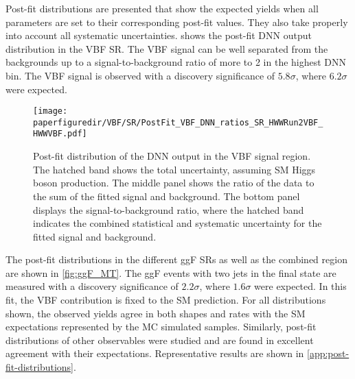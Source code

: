 Post-fit distributions are presented that show the expected yields when all parameters are set to their corresponding post-fit values. They also take properly into account all systematic uncertainties.  shows the post-fit DNN output distribution in the VBF SR.
The VBF signal can be well separated from the backgrounds up to a signal-to-background ratio of more to 2 in the highest DNN bin. 
The VBF signal is observed with a discovery significance of $5.8\sigma$, where $6.2\sigma$ were expected.
\begin{figure}[htb]
  \centering
  \texttt{[image: \\paperfiguredir/VBF/SR/PostFit\_VBF\_DNN\_ratios\_SR\_HWWRun2VBF\_HWWVBF.pdf]}
  \caption{
    Post-fit distribution of the DNN output in the VBF signal region.
    The hatched band shows the total uncertainty, assuming SM Higgs boson production.
    The middle panel shows the ratio of the data to the sum of the fitted signal and background.
    The bottom panel displays the signal-to-background ratio, where the hatched band indicates the combined statistical and systematic uncertainty for the fitted signal and background.
  }
  \label{fig:VBF_DNN}
  \end{figure}
The post-fit \mT distributions in the different ggF SRs as well as the combined region are shown in \cref{fig:ggF_MT}.
The ggF events with two jets in the final state are measured with a discovery significance of $2.2\sigma$, where $1.6\sigma$ were expected. In this fit, the VBF contribution is fixed to the SM prediction.
For all distributions shown, the observed yields agree in both shapes and rates with the SM expectations represented by the MC simulated samples. 
Similarly, post-fit distributions of other observables were studied and are found in excellent agreement with their expectations. Representative results are shown in \cref{app:post-fit-distributions}. 

